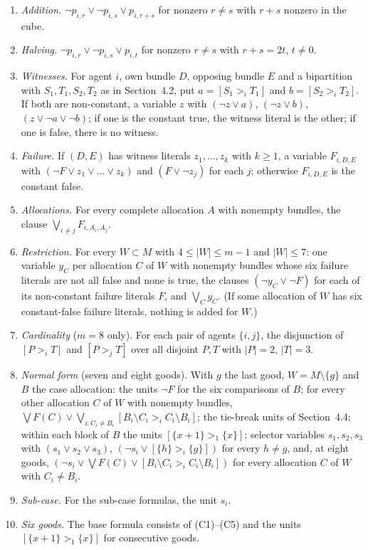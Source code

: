 \documentclass[11pt,a4paper]{article}
\theoremstyle{remark}
\begin{document}
\begin{enumerate}[label=(C\arabic*),leftmargin=*]
\item \emph{Addition.} $\lnot p_{i,r}\vee\lnot p_{i,s}\vee p_{i,r+s}$ for nonzero $r\ne s$ with $r+s$ nonzero in the cube.
\item \emph{Halving.} $\lnot p_{i,r}\vee\lnot p_{i,s}\vee p_{i,t}$ for nonzero $r\ne s$ with $r+s=2t$, $t\ne0$.
\item \emph{Witnesses.} For agent $i$, own bundle $D$, opposing bundle $E$ and a bipartition with $S_1,T_1,S_2,T_2$ as in Section~4.2, put $a=[S_1>_iT_1]$ and $b=[S_2>_iT_2]$. If both are non-constant, a variable $z$ with $(\lnot z\vee a)$, $(\lnot z\vee b)$, $(z\vee\lnot a\vee\lnot b)$; if one is the constant true, the witness literal is the other; if one is false, there is no witness.
\item \emph{Failure.} If $(D,E)$ has witness literals $z_1,\dots,z_k$ with $k\ge1$, a variable $F_{i,D,E}$ with $(\lnot F\vee z_1\vee\dots\vee z_k)$ and $(F\vee\lnot z_j)$ for each $j$; otherwise $F_{i,D,E}$ is the constant false.
\item \emph{Allocations.} For every complete allocation $A$ with nonempty bundles, the clause $\bigvee_{i\ne j}F_{i,A_i,A_j}$.
\item \emph{Restriction.} For every $W\subset M$ with $4\le|W|\le m-1$ and $|W|\le7$: one variable $y_C$ per allocation $C$ of $W$ with nonempty bundles whose six failure literals are not all false and none is true, the clauses $(\lnot y_C\vee\lnot F)$ for each of its non-constant failure literals $F$, and $\bigvee_C y_C$. (If some allocation of $W$ has six constant-false failure literals, nothing is added for $W$.)
\item \emph{Cardinality} ($m=8$ only). For each pair of agents $\{i,j\}$, the disjunction of $[P>_iT]$ and $[P>_jT]$ over all disjoint $P,T$ with $|P|=2$, $|T|=3$.
\item \emph{Normal form} (seven and eight goods). With $g$ the last good, $W=M\setminus\{g\}$ and $B$ the case allocation: the units $\lnot F$ for the six comparisons of $B$; for every other allocation $C$ of $W$ with nonempty bundles, $\bigvee F(C)\vee\bigvee_{i:C_i\ne B_i}[B_i\setminus C_i>_iC_i\setminus B_i]$; the tie-break units of Section~4.4; within each block of $B$ the units $[\{x+1\}>_1\{x\}]$; selector variables $s_1,s_2,s_3$ with $(s_1\vee s_2\vee s_3)$, $(\lnot s_i\vee[\{h\}>_i\{g\}])$ for every $h\ne g$, and, at eight goods, $(\lnot s_i\vee\bigvee F(C)\vee[B_i\setminus C_i>_iC_i\setminus B_i])$ for every allocation $C$ of $W$ with $C_i\ne B_i$.
\item \emph{Sub-case.} For the sub-case formulas, the unit $s_i$.
\item \emph{Six goods.} The base formula consists of (C1)--(C5) and the units $[\{x+1\}>_1\{x\}]$ for consecutive goods.
\end{enumerate}
\end{document}
